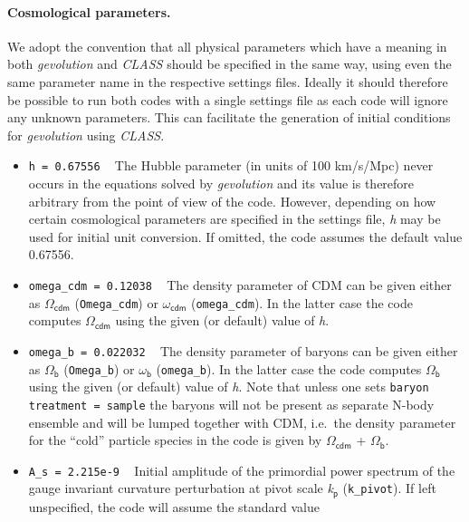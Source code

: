 \documentclass[a4paper,10pt]{article}
\begin{document}
\paragraph{Cosmological parameters.} We adopt the convention that all physical parameters which have a meaning in both \textit{gevolution} and \textit{CLASS} should be specified in the same way, using even the same parameter name in the respective settings files. Ideally it should therefore be possible to run both codes with a single settings file as each code will ignore any unknown parameters. This can facilitate the generation of initial conditions for \textit{gevolution} using \textit{CLASS}.
\begin{itemize}
 \item[] \hspace{-25pt}\texttt{h = 0.67556} ~ The Hubble parameter (in units of 100 km/s/Mpc) never occurs in the equations solved by
 \textit{gevolution} and its value is therefore arbitrary from the point of view of the code. However, depending on how certain cosmological
 parameters are specified in the settings file, \textit{h} may be used for initial unit conversion. If omitted, the code assumes the default
 value 0.67556.
 \item[] \hspace{-25pt}\texttt{omega\_cdm = 0.12038} ~ The density parameter of CDM can be given either as $\mathsf{\Omega}_\mathsf{cdm}$
 (\texttt{Omega\_cdm}) or $\mathsf{\omega}_\mathsf{cdm}$ (\texttt{omega\_cdm}). In the latter case the code computes
 $\mathsf{\Omega}_\mathsf{cdm}$ using the given (or default) value of \textit{h}.
 \item[] \hspace{-25pt}\texttt{omega\_b = 0.022032} ~ The density parameter of baryons can be given either as $\mathsf{\Omega}_\mathsf{b}$
 (\texttt{Omega\_b}) or $\mathsf{\omega}_\mathsf{b}$ (\texttt{omega\_b}). In the latter case the code computes $\mathsf{\Omega}_\mathsf{b}$
 using the given (or default) value of \textit{h}. Note that unless one sets \texttt{baryon treatment = sample} the baryons will not be
 present as separate N-body ensemble and will be lumped together with CDM, i.e.\ the density parameter for the ``cold'' particle species in
 the code is given by $\mathsf{\Omega}_\mathsf{cdm}$ + $\mathsf{\Omega}_\mathsf{b}$.
 \item[] \hspace{-25pt}\texttt{A\_s = 2.215e-9} ~ Initial amplitude of the primordial power spectrum of the gauge invariant curvature
 perturbation at pivot scale \textit{k}$_\mathsf{p}$ (\texttt{k\_pivot}). If left unspecified, the code will assume the standard value

\end{itemize}
\end{document}
